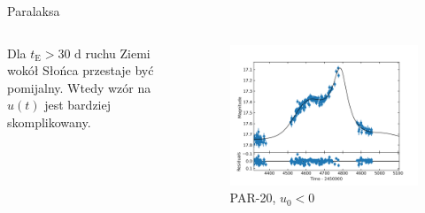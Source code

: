 \documentclass{beamer}
\begin{document}
\begin{frame}{Paralaksa}
    \begin{columns}
        \begin{column}{0.4\linewidth}
            Dla $t_{\text{E}}>30 \text{ d}$ ruchu Ziemi wokół Słońca przestaje być pomijalny. Wtedy wzór na $u(t)$ jest bardziej skomplikowany.

        \end{column}

        \begin{column}{0.5\linewidth}
            \begin{figure}
                \centering
                \includegraphics[width = \textwidth]{../sim30/parallax/png/PAR-20-noaver.dat-.png}
                \caption*{\tiny{PAR-20, $u_0<0$}}
            \end{figure}
        \end{column}
    \end{columns}

\end{frame}
\end{document}

